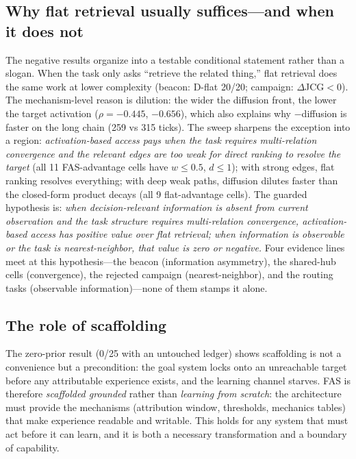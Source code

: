 \documentclass[10pt,a4paper]{article}
\begin{document}
\subsection{Why flat retrieval usually suffices---and when it does not}
The negative results organize into a testable conditional statement rather than a slogan. When the task only asks ``retrieve the related thing,'' flat retrieval does the same work at lower complexity (beacon: D-flat 20/20; campaign: $\Delta$JCG${<}0$). The mechanism-level reason is dilution: the wider the diffusion front, the lower the target activation ($\rho{=}{-}0.445$, ${-}0.656$), which also explains why $-$diffusion is faster on the long chain (259 vs 315 ticks). The sweep sharpens the exception into a region: \emph{activation-based access pays when the task requires multi-relation convergence and the relevant edges are too weak for direct ranking to resolve the target} (all 11 FAS-advantage cells have $w{\le}0.5$, $d{\le}1$); with strong edges, flat ranking resolves everything; with deep weak paths, diffusion dilutes faster than the closed-form product decays (all 9 flat-advantage cells). The guarded hypothesis is: \emph{when decision-relevant information is absent from current observation and the task structure requires multi-relation convergence, activation-based access has positive value over flat retrieval; when information is observable or the task is nearest-neighbor, that value is zero or negative.} Four evidence lines meet at this hypothesis---the beacon (information asymmetry), the shared-hub cells (convergence), the rejected campaign (nearest-neighbor), and the routing tasks (observable information)---none of them stamps it alone.

\subsection{The role of scaffolding}
The zero-prior result (0/25 with an untouched ledger) shows scaffolding is not a convenience but a precondition: the goal system locks onto an unreachable target before any attributable experience exists, and the learning channel starves. FAS is therefore \emph{scaffolded grounded} rather than \emph{learning from scratch}: the architecture must provide the mechanisms (attribution window, thresholds, mechanics tables) that make experience readable and writable. This holds for any system that must act before it can learn, and it is both a necessary transformation and a boundary of capability.
\end{document}
